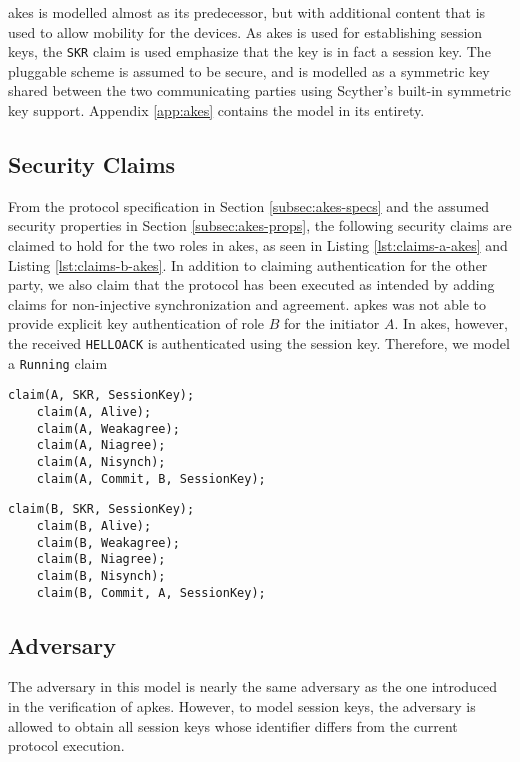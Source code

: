 \gls{akes} is modelled almost as its predecessor, but with additional content that is used to allow mobility for the devices. As \gls{akes} is used for establishing session keys, the \texttt{SKR} claim is used emphasize that the key is in fact a session key. The pluggable scheme is assumed to be secure, and is modelled as a symmetric key shared between the two communicating parties using Scyther's built-in symmetric key support. Appendix \ref{app:akes} contains the model in its entirety. 

\subsection{Security Claims}

From the protocol specification in Section \ref{subsec:akes-specs} and the assumed security properties in Section \ref{subsec:akes-props}, the following security claims are claimed to hold for the two roles in \gls{akes}, as seen in Listing \ref{lst:claims-a-akes} and Listing \ref{lst:claims-b-akes}. In addition to claiming authentication for the other party, we also claim that the protocol has been executed as intended by adding claims for non-injective synchronization and agreement. \gls{apkes} was not able to provide explicit key authentication of role $B$ for the initiator $A$. In \gls{akes}, however, the received \texttt{HELLOACK} is authenticated using the session key. Therefore, we model a \texttt{Running} claim 

\begin{lstlisting}[caption={Security claims for role A in AKES.}, label={lst:claims-a-akes}]
	claim(A, SKR, SessionKey);
	claim(A, Alive);
	claim(A, Weakagree);
	claim(A, Niagree);
	claim(A, Nisynch);
	claim(A, Commit, B, SessionKey);
\end{lstlisting}

\begin{lstlisting}[caption={Security claims for role B in AKES.}, label={lst:claims-b-akes}]
	claim(B, SKR, SessionKey);
	claim(B, Alive);
	claim(B, Weakagree);
	claim(B, Niagree);
	claim(B, Nisynch);
	claim(B, Commit, A, SessionKey);
\end{lstlisting}

\subsection{Adversary}

The adversary in this model is nearly the same adversary as the one introduced in the verification of \gls{apkes}. However, to model session keys, the adversary is allowed to obtain all session keys whose identifier differs from the current protocol execution. 
\newpage
